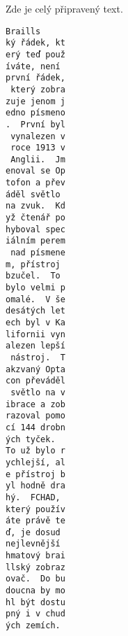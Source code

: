 \clearpage

Zde je celý připravený text.

\begin{multicols}{3}
\begin{verbatim}
Braills
ký řádek, kt
erý teď použ
íváte, není 
první řádek,
 který zobra
zuje jenom j
edno písmeno
.  První byl
 vynalezen v
 roce 1913 v
 Anglii.  Jm
enoval se Op
tofon a přev
áděl světlo 
na zvuk.  Kd
yž čtenář po
hyboval spec
iálním perem
 nad písmene
m, přístroj 
bzučel.  To 
bylo velmi p
omalé.  V še
desátých let
ech byl v Ka
lifornii vyn
alezen lepší
 nástroj.  T
akzvaný Opta
con převáděl
 světlo na v
ibrace a zob
razoval pomo
cí 144 drobn
ých tyček.  
To už bylo r
ychlejší, al
e přístroj b
yl hodně dra
hý.  FCHAD, 
který použív
áte právě te
ď, je dosud 
nejlevnější 
hmatový brai
llský zobraz
ovač.  Do bu
doucna by mo
hl být dostu
pný i v chud
ých zemích.
\end{verbatim}
\end{multicols}

